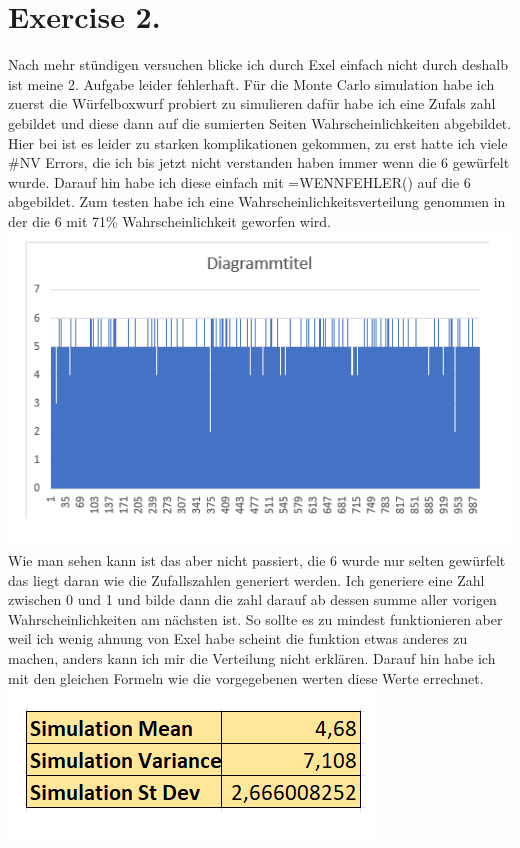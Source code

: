\documentclass{scrartcl}
\begin{document}
\section*{Exercise 2. }
Nach mehr stündigen versuchen blicke ich durch Exel einfach nicht durch deshalb ist meine 2. Aufgabe leider fehlerhaft. Für die Monte Carlo simulation habe ich zuerst die Würfelboxwurf probiert zu simulieren dafür habe ich eine Zufals zahl gebildet und diese dann auf die sumierten Seiten Wahrscheinlichkeiten abgebildet. Hier bei ist es leider zu starken komplikationen gekommen, zu erst hatte ich viele \#NV Errors, die ich bis jetzt nicht verstanden haben immer wenn die 6 gewürfelt wurde. Darauf hin habe ich diese einfach mit =WENNFEHLER() auf die 6 abgebildet. Zum testen habe ich eine Wahrscheinlichkeitsverteilung genommen in der die 6 mit 71\% Wahrscheinlichkeit geworfen wird.\\
\includegraphics*[scale=0.8]{ExelHorror1.png}\\
Wie man sehen kann ist das aber nicht passiert, die 6 wurde nur selten gewürfelt das liegt daran wie die Zufallszahlen generiert werden. Ich generiere eine Zahl zwischen 0 und 1 und bilde dann die zahl darauf ab dessen summe aller vorigen Wahrscheinlichkeiten am nächsten ist. So sollte es zu mindest funktionieren aber weil ich wenig ahnung von Exel habe scheint die funktion etwas anderes zu machen, anders kann ich mir die Verteilung nicht erklären. Darauf hin habe ich mit den gleichen Formeln wie die vorgegebenen werten diese Werte errechnet.\\
\includegraphics*[scale=0.8]{ExelHorror2.png}\\
\end{document}
